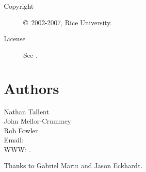 \documentclass[english]{article}
\begin{document}
\begin{description}
\item[Copyright] \copyright\ 2002-2007, Rice University.
\item[License] See .
\end{description}

\section{Authors}

\noindent
Nathan Tallent \\
John Mellor-Crummey \\
Rob Fowler \\
Email:  \\
WWW: .

Thanks to Gabriel Marin and Jason Eckhardt.

\LatexManEnd
\end{document}
